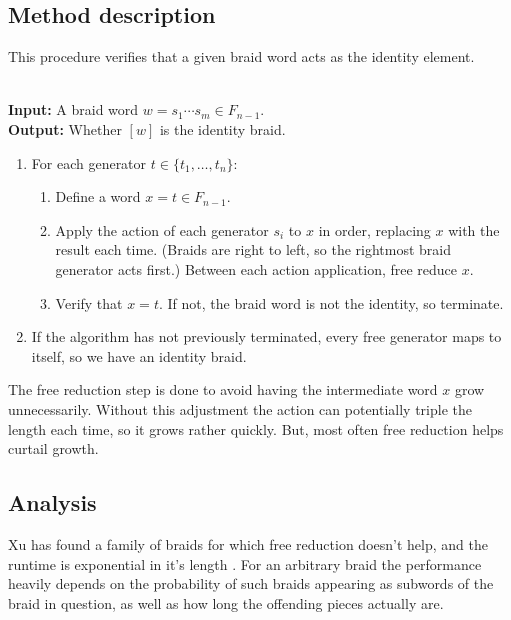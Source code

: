 \documentclass[12pt]{thesis}
\begin{document}
\subsection{Method description}

This procedure verifies that a given braid word
acts as the identity element.
\begin{algorithm}
    ~\\
    \textbf{Input:}  A braid word $w = s_{1} \cdots s_{m} \in F_{n-1}$. 
    ~\\
    \textbf{Output:}  Whether $[w]$ is the identity braid.
\begin{enumerate}
    \item For each generator $t \in \{ t_{1} , \ldots , t_{n} \}$:

    \begin{enumerate}
        \item Define a word $x = t \in F_{n-1}$.

        \item Apply the action of each generator $s_{i}$ to $x$ in order, replacing $x$ with the result each time.
              (Braids are right to left, so the rightmost braid generator acts first.)
              Between each action application, free reduce $x$.

        \item Verify that $x = t$.
              If not, the braid word is not the identity,
              so terminate.
    \end{enumerate}

    \item If the algorithm has not previously terminated,
           every free generator maps to itself,
           so we have an identity braid.
\end{enumerate}

\end{algorithm}

The free reduction step is done to avoid having the intermediate
word $x$ grow unnecessarily. Without this adjustment
the action can potentially triple the length each time, so it grows rather quickly.
But, most often free reduction helps curtail growth.

\subsection{Analysis}

Xu has found a family of braids for which
free reduction doesn't help, and the runtime is exponential in it's length \cite{word-problem-haskell}.
For an arbitrary braid the performance heavily depends on the probability
of such braids appearing as subwords of the braid in question,
as well as how long the offending pieces actually are.
\end{document}
